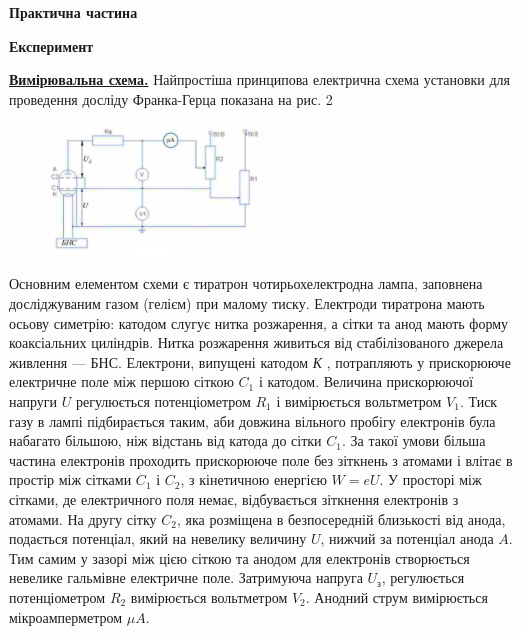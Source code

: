 \documentclass[12pt,a4paper]{article}
\begin{document}
    \vspace{1em}

    \begin{center} \textbf{\large Практична частина} \end{center}

    \begin{center} \textbf{Експеримент} \end{center}

    \textbf{\underline{Вимірювальна схема.}} Найпростіша принципова електрична схема установки для проведення досліду Франка-Герца показана на рис. 2 

    \begin{figure}[h!]

        \renewcommand{\thefigure}{\arabic{figure}} %

        \centering
        \includegraphics[width=0.5\textwidth]{2.png}
        \caption{}
        \label{fig2:schema}

    \end{figure}

    Основним елементом схеми є тиратрон
    чотирьохелектродна лампа, заповнена досліджуваним газом (гелієм) при малому тиску.
    Електроди тиратрона мають осьову симетрію: катодом слугує нитка розжарення,
    а сітки та анод мають форму коаксіальних циліндрів. Нитка розжарення живиться
    від стабілізованого джерела живлення --- БНС. Електрони, випущені катодом \textit{К}
    , потрапляють у прискорююче електричне поле між першою сіткою
    $C_1$ і катодом. Величина прискорюючої напруги $U$ регулюється потенціометром $R_1$
    і вимірюється вольтметром $V_1$.
    Тиск газу в лампі підбирається таким, аби довжина вільного пробігу електронів
    була набагато більшою, ніж відстань від катода до сітки $C_1$.
    За такої умови більша частина електронів проходить прискорююче поле
    без зіткнень з атомами і влітає в простір між сітками $C_1$ і $C_2$,
    з кінетичною енергією $W = eU$.
    У просторі між сітками, де електричного поля немає,
    відбувається зіткнення електронів з атомами. На другу сітку $C_2$,
    яка розміщена в безпосередній близькості від анода, подається потенціал,
    який на невелику величину $U$, нижчий за потенціал анода $A$.
    Тим самим у зазорі між цією сіткою та анодом для електронів створюється
    невелике гальмівне електричне поле. Затримуюча напруга $U_{\text{з}}$,
    регулюється потенціометром $R_2$ вимірюється вольтметром $V_2$.
    Анодний струм вимірюється мікроамперметром $\mu A$.
\end{document}
